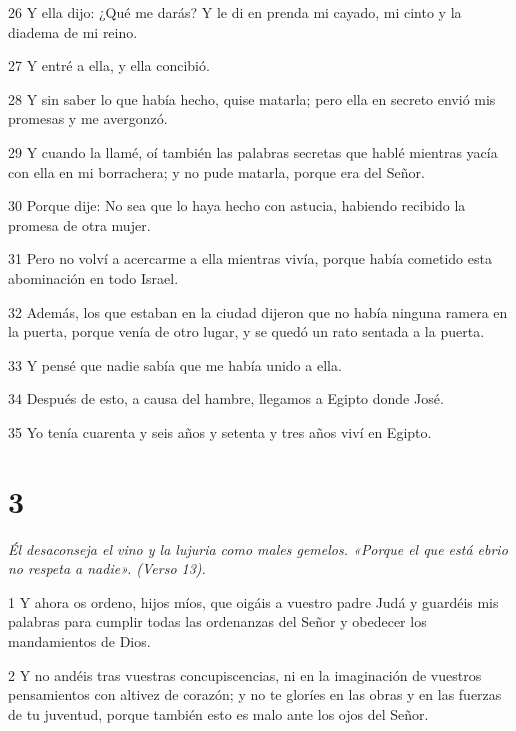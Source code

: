 \par 26 Y ella dijo: ¿Qué me darás? Y le di en prenda mi cayado, mi cinto y la diadema de mi reino.

\par 27 Y entré a ella, y ella concibió.

\par 28 Y sin saber lo que había hecho, quise matarla; pero ella en secreto envió mis promesas y me avergonzó.

\par 29 Y cuando la llamé, oí también las palabras secretas que hablé mientras yacía con ella en mi borrachera; y no pude matarla, porque era del Señor.

\par 30 Porque dije: No sea que lo haya hecho con astucia, habiendo recibido la promesa de otra mujer.

\par 31 Pero no volví a acercarme a ella mientras vivía, porque había cometido esta abominación en todo Israel.

\par 32 Además, los que estaban en la ciudad dijeron que no había ninguna ramera en la puerta, porque venía de otro lugar, y se quedó un rato sentada a la puerta.

\par 33 Y pensé que nadie sabía que me había unido a ella.

\par 34 Después de esto, a causa del hambre, llegamos a Egipto donde José.

\par 35 Yo tenía cuarenta y seis años y setenta y tres años viví en Egipto.

\chapter{3}

\par \textit{Él desaconseja el vino y la lujuria como males gemelos. «Porque el que está ebrio no respeta a nadie». (Verso 13).}

\par 1 Y ahora os ordeno, hijos míos, que oigáis a vuestro padre Judá y guardéis mis palabras para cumplir todas las ordenanzas del Señor y obedecer los mandamientos de Dios.

\par 2 Y no andéis tras vuestras concupiscencias, ni en la imaginación de vuestros pensamientos con altivez de corazón; y no te gloríes en las obras y en las fuerzas de tu juventud, porque también esto es malo ante los ojos del Señor.

